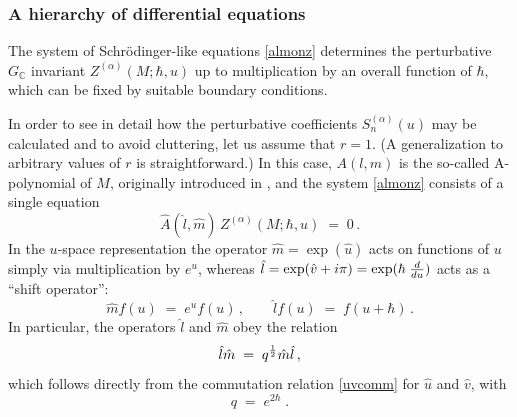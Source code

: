 \documentclass[hyper]{JHEP3}
\newcommand{\C}{{\mathbb{C}}}
\newcommand\be{\begin{equation}}
\newcommand\ee{\end{equation}}
\def\={\;=\;}
\begin{document}

\subsubsection{A hierarchy of differential equations}
\label{sec:hierarchy}

The system of Schr\"odinger-like equations \eqref{almonz} determines
the perturbative $G_{\C}$ invariant $Z^{(\alpha)} (M;\hbar,u)$
up to multiplication by an overall function of $\hbar$,
which can be fixed by suitable boundary conditions.

In order to see in detail how the perturbative coefficients $S_n^{(\alpha)}(u)$
may be calculated and to avoid cluttering, let us assume that $r=1$.
(A generalization to arbitrary values of $r$ is straightforward.)
In this case, $A(l,m)$ is the so-called A-polynomial of $M$,
originally introduced in \cite{cooper-1994},
and the system \eqref{almonz} consists of a single equation
\be
\widehat{A} (\hat l, \hat m)\,Z^{(\alpha)} (M;\hbar,u) \= 0\,.
\label{ahatcondition}
\ee
In the $u$-space representation the operator $\hat m = \exp (\hat u)$
acts on functions of $u$ simply via multiplication by $e^u$,
whereas $\hat l = \exp (\hat v +i\pi)= \exp (\hbar\;{d \over du})$
acts as a ``shift operator'':
\be
\hat m f(u) \= e^u f(u) \,,\qquad
\hat l f(u) \= f(u + \hbar )\,.
\label{lmactonfofu}
\ee
In particular, the operators $\hat l$ and $\hat m$ obey the relation
\be
\hat l \hat m  \= q^{{1 \over 2}} \hat m \hat l\,,
\ee
which follows directly from the commutation relation \eqref{uvcomm}
for $\hat u$ and $\hat v$, with
\be
q \= e^{2 \hbar}\;.
\ee
\end{document}
